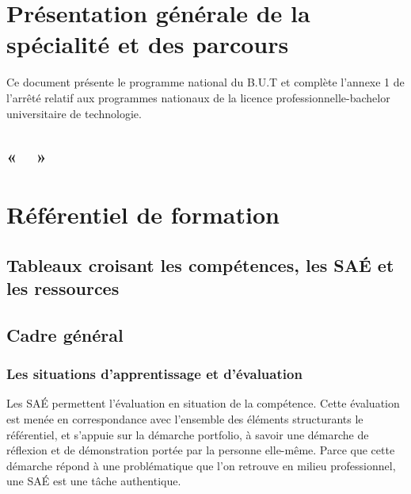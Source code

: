\documentclass[10pt]{article}
\newcommand{\selectallparcours}{\def\leparcours{\VAR{data.getParcoursCanonical(data.getParcoursObjects())|le}}}
\begin{document}
\newpage
\section[Présentation générale]{Présentation générale de la spécialité et des parcours}
Ce document présente le programme national du B.U.T 
et complète l’annexe 1 de l’arrêté relatif aux programmes nationaux de
la licence professionnelle-bachelor universitaire de technologie.



\subsection*{ «~~»}

\selectallparcours
\section{Référentiel de formation}
\subsection{Tableaux croisant les compétences, les SAÉ et les ressources}
\selectallparcours


\newpage
\subsection{Cadre général}
\subsubsection*{Les situations d’apprentissage et d’évaluation}
Les SAÉ permettent l’évaluation en situation de la compétence. Cette
évaluation est menée en correspondance avec l’ensemble des éléments
structurants le référentiel, et s’appuie sur la démarche portfolio, à
savoir une démarche de réflexion et de démonstration portée par la
personne elle-même.  Parce que cette démarche répond à une problématique
que l’on retrouve en milieu professionnel, une SAÉ est une tâche
authentique.
\end{document}
